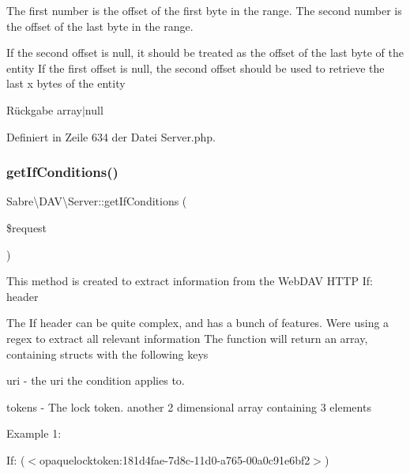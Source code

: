 The first number is the offset of the first byte in the range. The second number is the offset of the last byte in the range.

If the second offset is null, it should be treated as the offset of the last byte of the entity If the first offset is null, the second offset should be used to retrieve the last x bytes of the entity

\begin{DoxyReturn}{Rückgabe}
array$\vert$null 
\end{DoxyReturn}


Definiert in Zeile 634 der Datei Server.\+php.

\mbox{\label{class_sabre_1_1_d_a_v_1_1_server_a13e3d57b6eb70a17ae9049cf8bfad5b9}} 
\subsubsection{\texorpdfstring{get\+If\+Conditions()}{getIfConditions()}}
{\footnotesize\ttfamily Sabre\textbackslash{}\+D\+A\+V\textbackslash{}\+Server\+::get\+If\+Conditions (\begin{DoxyParamCaption}\item[{\mbox{\hyperlink{interface_sabre_1_1_h_t_t_p_1_1_request_interface}{Request\+Interface}}}]{\$request }\end{DoxyParamCaption})}

This method is created to extract information from the Web\+D\+AV H\+T\+TP \textquotesingle{}If\+:\textquotesingle{} header

The If header can be quite complex, and has a bunch of features. We\textquotesingle{}re using a regex to extract all relevant information The function will return an array, containing structs with the following keys


\begin{DoxyItemize}
\item uri -\/ the uri the condition applies to.
\item tokens -\/ The lock token. another 2 dimensional array containing 3 elements
\end{DoxyItemize}

Example 1\+:

If\+: ($<$opaquelocktoken\+:181d4fae-\/7d8c-\/11d0-\/a765-\/00a0c91e6bf2$>$)

